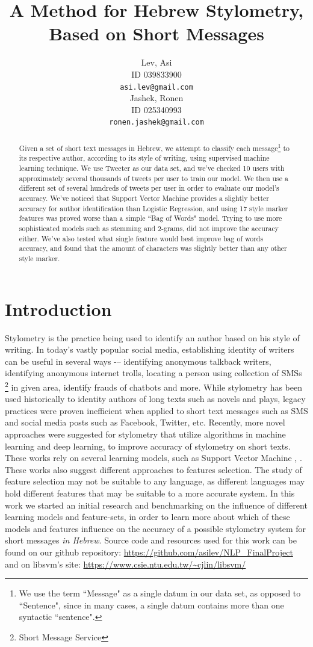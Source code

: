 \documentclass[a4paper]{article}
\author{Lev, Asi \\
	ID 039833900 \\
	{\tt asi.lev@gmail.com} \\
\And
	Jashek, Ronen\\
	ID 025340993\\
	{\tt ronen.jashek@gmail.com} \\	
}
\title{A Method for Hebrew Stylometry, Based on Short Messages}
\date{}
\begin{document}
\maketitle
\begin{abstract}

Given a set of short text messages in Hebrew, we attempt to classify each message\footnote{We use the term ``Message" as a single datum in our data set, as opposed to ``Sentence", since in many cases, a single datum contains more than one syntactic ``sentence".} to its respective author, according to its style of writing, using supervised machine learning technique.
We use Tweeter as our data set, and we've checked 10 users with approximately several thousands of tweets per user to train our model.
We then use a different set of several hundreds of tweets per user in order to evaluate our model's accuracy.
We've noticed that Support Vector Machine provides a slightly better accuracy for author identification than Logistic Regression, and using 17 style marker features was proved worse than a simple ``Bag of Words" model. Trying to use more sophisticated models such as stemming and 2-grams, did not improve the accuracy either. We've also tested what single feature would best improve bag of words accuracy, and found that the amount of characters was slightly better than any other style marker.
\end{abstract}
\section{Introduction}

Stylometry is the practice being used to identify an author based on his style of writing. In today's vastly popular social media, establishing identity of writers can be useful in several ways -– identifying anonymous talkback writers, identifying anonymous internet trolls, locating a person using collection of SMSs \footnote{Short Message Service} in given area, identify frauds of chatbots and more.
While stylometry has been used historically to identity authors of long texts such as novels and plays, legacy practices were proven inefficient when applied to short text messages such as SMS and social media posts such as Facebook, Twitter, etc. \citep{green}
Recently, more novel approaches were suggested for stylometry that utilize algorithms in machine learning and deep learning, to improve accuracy of stylometry on short texts.
These works rely on several learning models, such as Support Vector Machine \citep{green}, \citep{schwartz}.
These works also suggest different approaches to features selection. The study of feature selection may not be suitable to any language, as different languages may hold different features that may be suitable to a more accurate system.
In this work we started an initial research and benchmarking on the influence of different learning models and feature-sets, in order to learn more about which of these models and features influence on the accuracy of a possible stylometry system for short messages \emph{in Hebrew}.
Source code and resources used for this work can be found on our github repository: \url{https://github.com/asilev/NLP\_FinalProject} and on libsvm's site: \url{https://www.csie.ntu.edu.tw/~cjlin/libsvm/} \citep{chang}
\end{document}
